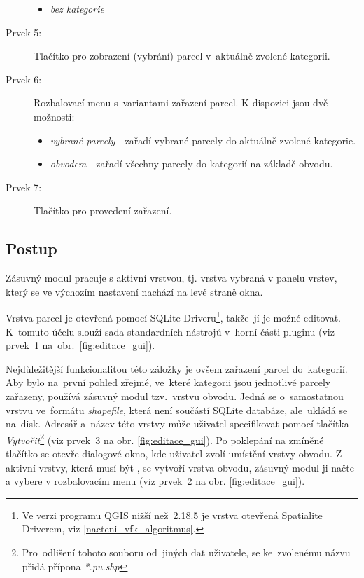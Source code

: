\begin{description}
\begin{itemize}[leftmargin=1.5cm, noitemsep]
		\item \textit{bez kategorie}
	\end{itemize}
	\item[Prvek 5:] Tlačítko pro zobrazení (vybrání) parcel v~aktuálně zvolené kategorii.
	\item[Prvek 6:] Rozbalovací menu s~variantami zařazení parcel. K dispozici jsou dvě možnosti:
	\begin{itemize}[leftmargin=1.5cm, noitemsep]
		\item \textit{vybrané parcely} - zařadí vybrané parcely do aktuálně zvolené kategorie.
		\item \textit{obvodem} - zařadí všechny parcely do kategorií na základě obvodu.
	\end{itemize}
	\item[Prvek 7:] Tlačítko pro provedení zařazení.
\end{description}

\subsection{Postup}
\label{postup_editace}

Zásuvný modul pracuje s aktivní vrstvou, tj. vrstva vybraná v panelu vrstev, který se ve výchozím nastavení nachází na levé straně okna.

Vrstva parcel je otevřená pomocí SQLite Driveru\footnote{Ve verzi programu QGIS nižší než~2.18.5 je vrstva otevřená Spatialite Driverem, viz \ref{nacteni_vfk_algoritmus}.}, takže~jí je možné editovat. K~tomuto účelu slouží sada standardních nástrojů v~horní části pluginu (viz prvek~1 na~obr.~\ref{fig:editace_gui}).

Nejdůležitější funkcionalitou této záložky je ovšem zařazení parcel do~kategorií. Aby bylo na~první pohled zřejmé, ve~které kategorii jsou jednotlivé parcely zařazeny, používá zásuvný modul tzv.~vrstvu obvodu. Jedná se o~samostatnou vrstvu ve~formátu \textit{shapefile}, která není součástí SQLite databáze, ale~ukládá se na~disk. Adresář a~název této vrstvy může uživatel specifikovat pomocí tlačítka \textit{Vytvořit}\footnote{Pro~odlišení tohoto souboru od~jiných dat uživatele, se ke~zvolenému názvu přidá přípona \textit{*.pu.shp}} (viz prvek~3 na obr. \ref{fig:editace_gui}). Po poklepání na zmíněné tlačítko se otevře dialogové okno, kde uživatel zvolí umístění vrstvy obvodu. Z aktivní vrstvy, která musí být , se vytvoří vrstva obvodu, zásuvný modul ji načte a vybere v rozbalovacím menu (viz prvek~2 na obr. \ref{fig:editace_gui}).

